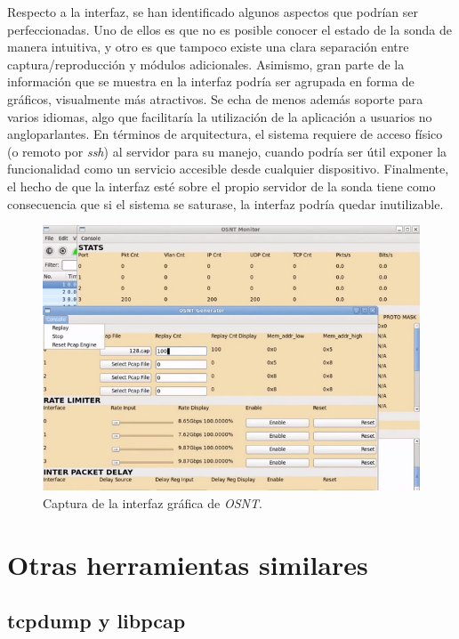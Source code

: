 Respecto a la interfaz, se han identificado algunos aspectos que podrían ser perfeccionadas.
Uno de ellos es que no es posible conocer el estado de la sonda de manera intuitiva, y otro es que tampoco existe una clara separación entre captura/reproducción y módulos adicionales.
Asimismo, gran parte de la información que se muestra en la interfaz podría ser agrupada en forma de gráficos, visualmente más atractivos.
Se echa de menos además soporte para varios idiomas, algo que facilitaría la utilización de la aplicación a usuarios no angloparlantes.
En términos de arquitectura, el sistema requiere de acceso físico (o remoto por \textit{ssh}) al servidor para su manejo, cuando podría ser útil exponer la funcionalidad como un servicio accesible desde cualquier dispositivo.
Finalmente, el hecho de que la interfaz esté sobre el propio servidor de la sonda tiene como consecuencia que si el sistema se saturase, la interfaz podría quedar inutilizable.

\begin{figure}[H]
  \centering
  \includegraphics[width=\textwidth,clip=true]{graphics/capturas/osnt}
  \caption{Captura de la interfaz gráfica de \textit{OSNT}.}
  \label{fig:osnt}
\end{figure}

\section{Otras herramientas similares\label{sec:eda:otras}}

\subsection*{tcpdump y libpcap\label{sec:eda:tcpdump}}


